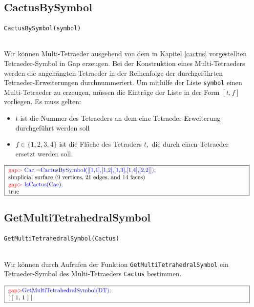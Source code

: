 \documentclass[12pt,titlepage,twoside,cleardoublepage]{article}
\theoremstyle{nummermitklammern}
\numberwithin{equation}{section}
\begin{document}
\subsection{CactusBySymbol}
\begin{large}
\texttt{CactusBySymbol(symbol)}
\end{large}\\
Wir können Multi-Tetraeder ausgehend von dem in Kapitel \ref{cactus} vorgestellten Tetraeder-Symbol in Gap erzeugen.
Bei der Konstruktion eines Multi-Tetraeders werden die angehängten Tetraeder in der Reihenfolge der durchgeführten Tetraeder-Erweiterungen durchnummeriert.
Um mithilfe der Liste \texttt{symbol} einen Multi-Tetraeder zu erzeugen, müssen die Einträge der Liste in der Form $[t,f]$ vorliegen. Es muss gelten:
\begin{itemize}
\item $t$ ist die Nummer des Tetraeders an dem eine Tetraeder-Erweiterung durchgeführt werden soll
\item $f\in  \{1,2,3,4\}$ ist die Fläche des Tetraders $t,$ die durch einen Tetraeder ersetzt werden soll.  
\end{itemize}
\begin{center}
$\fbox{
\parbox{14cm}{
\textcolor{red}{gap$>$} \textcolor{blue}{Cac:=CactusBySymbol([[1,1],[1,2],[1,3],[1,4],[2,2]]);}\newline
simplicial surface (9 vertices, 21 edges, and 14 faces)\newline
\textcolor{red}{gap$>$} \textcolor{blue}{IsCactus(Cac);}\newline
true
}
}$
\end{center}
\subsection{GetMultiTetrahedralSymbol}
\begin{large}
\texttt{GetMultiTetrahedralSymbol(Cactus)}
\end{large}\\
Wir können durch Aufrufen der Funktion \texttt{GetMultiTetrahedralSymbol} ein Tetraeder-Symbol des Multi-Tetraeders \texttt{Cactus} bestimmen.
\begin{center}
$\fbox{
\parbox{14cm}{
\textcolor{red}{gap$>$}\textcolor{blue}{GetMultiTetrahedralSymbol(DT);}\newline
[ [ 1, 1 ] ]
}
}$
\end{center}
\end{document}
